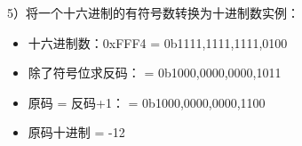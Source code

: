 5）将一个十六进制的有符号数转换为十进制数实例：
\begin{itemize}
\item 十六进制数：0xFFF4 = 0b1111,1111,1111,0100
\item 除了符号位求反码： = 0b1000,0000,0000,1011
\item 原码 = 反码+1：    = 0b1000,0000,0000,1100
\item 原码十进制 = -12
\end{itemize}

